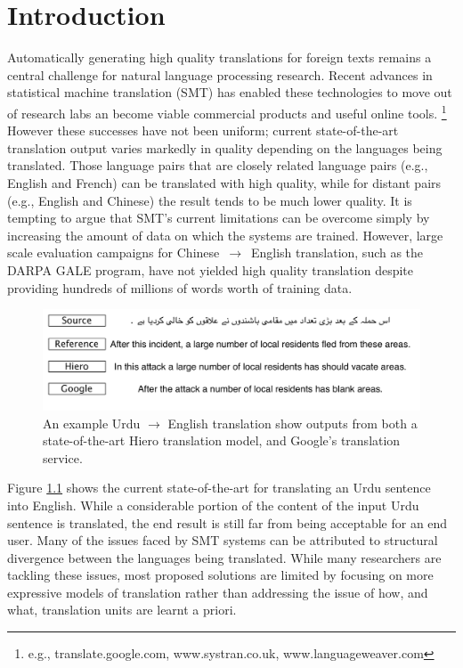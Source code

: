 \chapter{Introduction}

Automatically generating high quality translations for foreign texts remains a central challenge for natural language processing research.
Recent advances in statistical machine translation (SMT) has enabled these technologies to move out of research labs an become viable commercial products and useful online tools. \footnote{e.g., translate.google.com, www.systran.co.uk, www.languageweaver.com} 
However these successes have not been uniform; 
current state-of-the-art translation output varies markedly in quality depending on the languages being translated. 
Those language pairs that are closely related language pairs (e.g., English and French) can be translated with high quality, while for distant pairs (e.g., English and Chinese) the result tends to be much lower quality. 
It is tempting to argue that SMT's current limitations can be overcome simply by increasing the amount of data on which the systems are trained. 
However, large scale evaluation campaigns for Chinese~$\rightarrow$~English translation, such as the DARPA GALE program, have not yielded high quality translation despite providing hundreds of millions of words worth of training data. 

\begin{figure}[t]
  \centering \includegraphics[scale=0.55]{urdu_example_translation.pdf}
\caption{An example Urdu $\rightarrow$ English translation show outputs from both a state-of-the-art Hiero translation model, and Google's translation service.}
\label{fig:intro_urdu_example}
\end{figure}
Figure \ref{fig:intro_urdu_example} shows the current state-of-the-art for translating an Urdu sentence into English.
While a considerable portion of the content of the input Urdu sentence is translated, the end result is still far from being acceptable for an end user. 
Many of the issues faced by SMT systems can be attributed to structural divergence between the languages being translated.
While many researchers are tackling these issues, most proposed solutions are limited by focusing on more expressive models of translation rather than addressing the issue of how, and what, translation units are learnt a priori.


